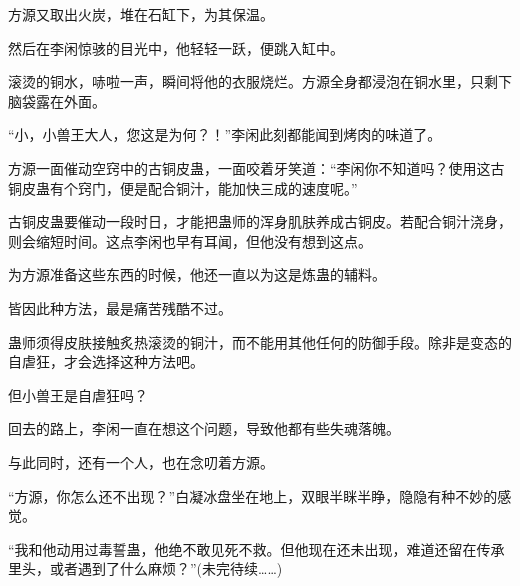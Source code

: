 \begin{this_body}
方源又取出火炭，堆在石缸下，为其保温。

然后在李闲惊骇的目光中，他轻轻一跃，便跳入缸中。

滚烫的铜水，哧啦一声，瞬间将他的衣服烧烂。方源全身都浸泡在铜水里，只剩下脑袋露在外面。

“小，小兽王大人，您这是为何？！”李闲此刻都能闻到烤肉的味道了。

方源一面催动空窍中的古铜皮蛊，一面咬着牙笑道：“李闲你不知道吗？使用这古铜皮蛊有个窍门，便是配合铜汁，能加快三成的速度呢。”

古铜皮蛊要催动一段时日，才能把蛊师的浑身肌肤养成古铜皮。若配合铜汁浇身，则会缩短时间。这点李闲也早有耳闻，但他没有想到这点。

为方源准备这些东西的时候，他还一直以为这是炼蛊的辅料。

皆因此种方法，最是痛苦残酷不过。

蛊师须得皮肤接触炙热滚烫的铜汁，而不能用其他任何的防御手段。除非是变态的自虐狂，才会选择这种方法吧。

但小兽王是自虐狂吗？

回去的路上，李闲一直在想这个问题，导致他都有些失魂落魄。

与此同时，还有一个人，也在念叨着方源。

“方源，你怎么还不出现？”白凝冰盘坐在地上，双眼半眯半睁，隐隐有种不妙的感觉。

“我和他动用过毒誓蛊，他绝不敢见死不救。但他现在还未出现，难道还留在传承里头，或者遇到了什么麻烦？”(未完待续……)

\end{this_body}

